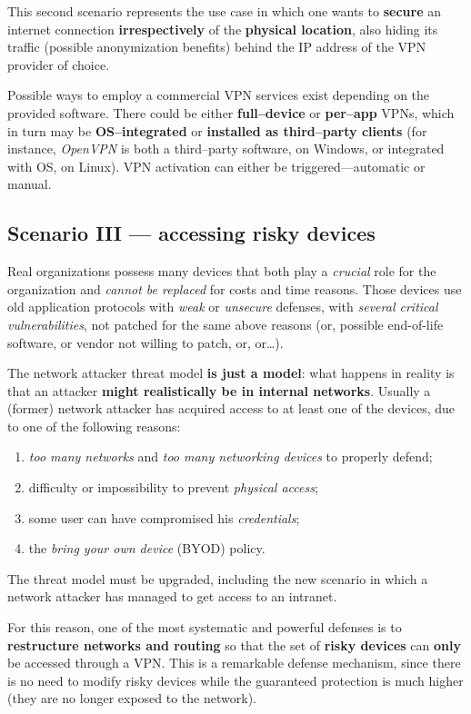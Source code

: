 \documentclass[10pt]{\classname}
\begin{document}
This second scenario represents the use case in which one wants to
\textbf{secure} an internet connection \textbf{irrespectively} of the
\textbf{physical location}, also hiding its traffic (possible anonymization
benefits) behind the IP address of the VPN provider of choice.

Possible ways to employ a commercial VPN services exist depending on the
provided software. There could be either \textbf{full--device} or
\textbf{per--app} VPNs, which in turn may be \textbf{OS--integrated} or
\textbf{installed as third--party clients} (for instance, \emph{OpenVPN} is
both a third--party software, on Windows, or integrated with OS, on Linux). VPN
activation can either be triggered---automatic or manual.

\subsection{Scenario III --- accessing risky devices}

Real organizations possess many devices that both play a \emph{crucial} role
for the organization and \emph{cannot be replaced} for costs and time reasons.
Those devices use old application protocols with \emph{weak} or \emph{unsecure}
defenses, with \emph{several critical vulnerabilities}, not patched for the
same above reasons (or, possible end-of-life software, or vendor not willing to
patch, or, or\dots).

The network attacker threat model \textbf{is just a model}: what happens in
reality is that an attacker \textbf{might realistically be in internal
networks}. Usually a (former) network attacker has acquired access to at least
one of the devices, due to one of the following reasons:
\begin{enumerate}
    \item \emph{too many networks} and \emph{too many networking devices} to
        properly defend;
    \item difficulty or impossibility to prevent \emph{physical access};
    \item some user can have compromised his \emph{credentials};
    \item the \emph{bring your own device} (BYOD) policy.
\end{enumerate}

The threat model must be upgraded, including the new scenario in which a
network attacker has managed to get access to an intranet.

For this reason, one of the most systematic and powerful defenses is to
\textbf{restructure networks and routing} so that the set of \textbf{risky
devices} can \textbf{only} be accessed through a VPN. This is a remarkable
defense mechanism, since there is no need to modify risky devices while the
guaranteed protection is much higher (they are no longer exposed to the
network).
\end{document}
